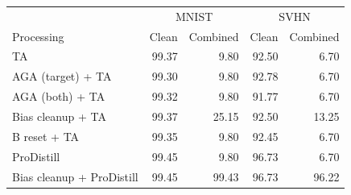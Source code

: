 \begin{tabular}{lrrrr}
\toprule
& \multicolumn{2}{c}{MNIST} & \multicolumn{2}{c}{SVHN} \\
Processing & Clean & Combined & Clean & Combined \\
\midrule
TA & 99.37 & 9.80 & 92.50 & 6.70 \\
AGA (target) + TA & 99.30 & 9.80 & 92.78 & 6.70 \\
AGA (both) + TA & 99.32 & 9.80 & 91.77 & 6.70 \\
Bias cleanup + TA & 99.37 & 25.15 & 92.50 & 13.25 \\
B reset + TA & 99.35 & 9.80 & 92.45 & 6.70 \\
ProDistill & 99.45 & 9.80 & 96.73 & 6.70 \\
Bias cleanup + ProDistill & 99.45 & 99.43 & 96.73 & 96.22 \\
\bottomrule
\end{tabular}
